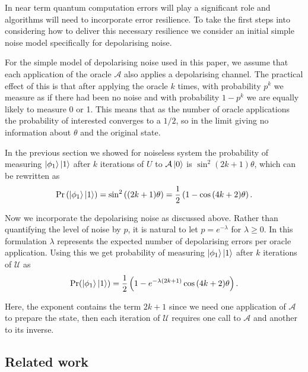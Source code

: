 In near term quantum computation errors will play a significant role and algorithms will need to incorporate error resilience. To take the first steps into considering how to deliver this necessary resilience we consider an initial simple noise model specifically for depolarising  noise.

For the simple model of depolarising noise used in this paper, we assume that each application of the oracle $\mathcal{A}$ also applies a depolarising channel. The practical effect of this is that after applying the oracle $k$ times, with probability $p^k$ we measure as if there had been no noise and with probability $1-p^k$ we are equally likely to measure 0 or 1. This means that as the number of oracle applications the probability of interested converges to a $1/2$, so in the limit giving no information about $\theta$ and the original state.

In the previous section we showed for noiseless system the probability of measuring $\ket{\phi_1} \ket{1}$ after $k$ iterations of $U$ to $\mathcal{A} \ket{0}$ is $\sin^2{(2k+1) \theta }$, which can be rewritten as
\[
\Pr\left(\ket{\phi_1} \ket{1}\right)=\sin^2{((2k+1) \theta) } = \frac{1}{2} \left( 1 - \cos{ (4k+2) \theta } \right).
\]




Now we incorporate the depolarising noise as discussed above. Rather than quantifying the level of noise by $p$, it is natural to let $p = e^{-\lambda}$ for $\lambda \geq 0$.  In this formulation $\lambda$ represents the expected number of depolarising errors per oracle application. Using this we get probability of measuring $\ket{\phi_1}\ket{1}$ after $k$ iterations of $\mathcal{U}$ as
\[
\Pr(\ket{\phi_1} \ket{1}) = \frac{1}{2} \left( 1 - e^{- \lambda (2k+1)} \cos{ (4k+2) \theta } \right).
\]

Here, the exponent contains the term $2k+1$ since we need one application of $\mathcal{A}$ to prepare the state, then each iteration of $\mathcal{U}$ requires one call to $\mathcal{A}$ and another to its inverse.



\subsection{Related work}


